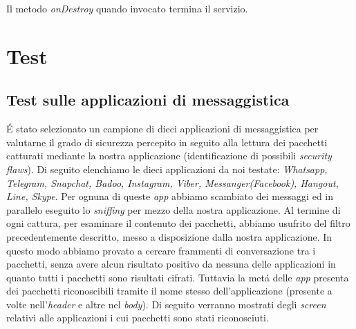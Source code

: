 \documentclass[12pt]{article} %
\begin{document}
Il metodo \textit{onDestroy} quando invocato termina il servizio.

\section{Test}

\subsection{Test sulle applicazioni di messaggistica}
\'E stato selezionato un campione di dieci applicazioni di messaggistica per valutarne il grado di sicurezza percepito in seguito alla lettura dei pacchetti catturati mediante la nostra applicazione (identificazione di possibili \textit{security flaws}). Di seguito elenchiamo le dieci applicazioni da noi testate: \textit{Whatsapp, Telegram, Snapchat, Badoo, Instagram, Viber, Messanger(Facebook), Hangout, Line, Skype}.
Per ognuna di queste \textit{app} abbiamo scambiato dei messaggi ed in parallelo eseguito lo \textit{sniffing} per mezzo della nostra applicazione. Al termine di ogni cattura, per esaminare il contenuto dei pacchetti, abbiamo usufrito del filtro precedentemente descritto, messo a disposizione dalla nostra applicazione. In questo modo abbiamo provato a cercare frammenti di conversazione tra i pacchetti, senza avere alcun risultato positivo da nessuna delle applicazioni in quanto tutti i pacchetti sono risultati cifrati. Tuttavia la met\'a delle \textit{app} presenta dei pacchetti riconoscibili tramite il nome stesso dell'applicazione (presente a volte nell'\textit{header} e altre nel \textit{body}).
Di seguito verranno mostrati degli \textit{screen} relativi alle applicazioni i cui pacchetti sono stati riconosciuti.
\end{document}
